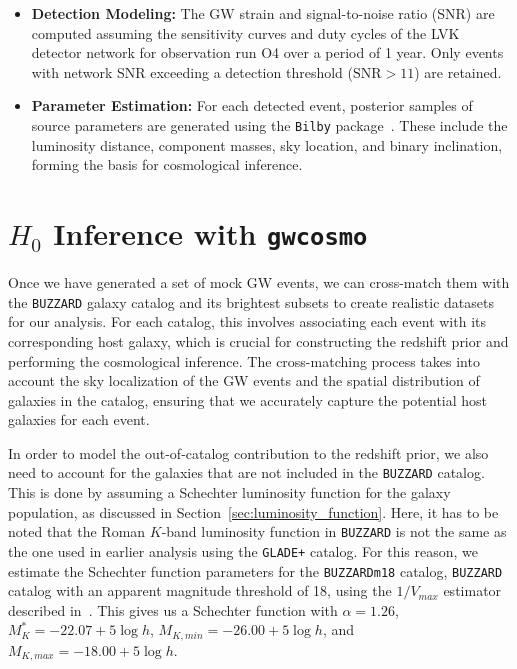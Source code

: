 \begin{itemize}
    \item \textbf{Detection Modeling:} The GW strain and signal-to-noise ratio (SNR) are computed assuming the sensitivity curves and duty cycles of the \acf{LVK} detector network for observation run O4 over a period of 1 year. Only events with network SNR exceeding a detection threshold ($\mathrm{SNR} > 11$) are retained.

    \item \textbf{Parameter Estimation:} For each detected event, posterior samples of source parameters are generated using the \texttt{Bilby} package~\citep{bilby_paper,bilby_mcmc_paper}. These include the luminosity distance, component masses, sky location, and binary inclination, forming the basis for cosmological inference.
\end{itemize}

\section{$H_0$ Inference with \texttt{gwcosmo}}
Once we have generated a set of mock \ac{GW} events, we can cross-match them with the \texttt{BUZZARD} galaxy catalog and its brightest subsets to create realistic datasets for our analysis. For each catalog, this involves associating each event with its corresponding host galaxy, which is crucial for constructing the redshift prior and performing the cosmological inference. The cross-matching process takes into account the sky localization of the \ac{GW} events and the spatial distribution of galaxies in the catalog, ensuring that we accurately capture the potential host galaxies for each event.

In order to model the out-of-catalog contribution to the redshift prior, we also need to account for the galaxies that are not included in the \texttt{BUZZARD} catalog. This is done by assuming a Schechter luminosity function for the galaxy population, as discussed in Section~\ref{sec:luminosity_function}. Here, it has to be noted that the Roman $K$-band luminosity function in \texttt{BUZZARD} is not the same as the one used in earlier analysis using the \texttt{GLADE+} catalog. For this reason, we estimate the Schechter function parameters for the \texttt{BUZZARDm18} catalog, \texttt{BUZZARD} catalog with an apparent magnitude threshold of 18, using the $1/V_{max}$ estimator described in~\citet{schmidt1968space,takeuchi2000tests}. This gives us a Schechter function with $\alpha=1.26$, $M^*_{K} = -22.07 +5\log h$, $M_{K, min} = -26.00 +5\log h$, and $M_{K, max} = -18.00 +5\log h$.

